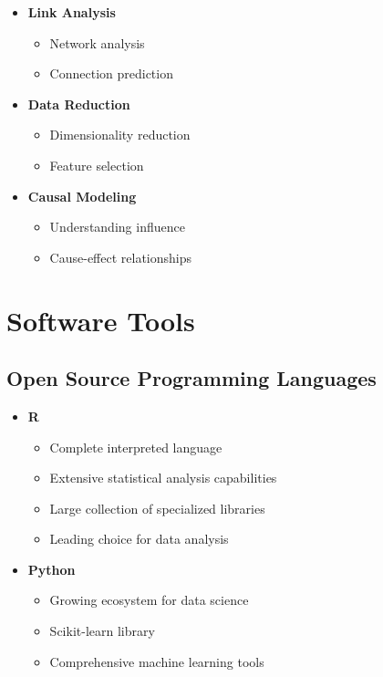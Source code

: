 \begin{itemize}
    \item \textbf{Link Analysis}
    \begin{itemize}
        \item Network analysis
        \item Connection prediction
    \end{itemize}
    
    \item \textbf{Data Reduction}
    \begin{itemize}
        \item Dimensionality reduction
        \item Feature selection
    \end{itemize}
    
    \item \textbf{Causal Modeling}
    \begin{itemize}
        \item Understanding influence
        \item Cause-effect relationships
    \end{itemize}
\end{itemize}

\chapter{Software Tools}

\section{Open Source Programming Languages}
\begin{itemize}
    \item \textbf{R}
    \begin{itemize}
        \item Complete interpreted language
        \item Extensive statistical analysis capabilities
        \item Large collection of specialized libraries
        \item Leading choice for data analysis
    \end{itemize}
    
    \item \textbf{Python}
    \begin{itemize}
        \item Growing ecosystem for data science
        \item Scikit-learn library
        \item Comprehensive machine learning tools
    \end{itemize}
\end{itemize}

